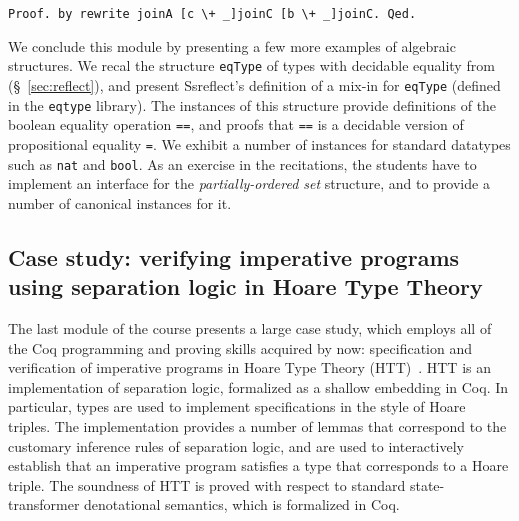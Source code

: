 \documentclass[blockstyle,preprint]{sigplanconf}
\newcommand{\is}[1]{\textcolor{blue}{(Ilya: {#1})}}
\newcommand{\an}[1]{\textcolor{red}{(Aleks: {#1})}}
\newcommand{\code}[1]{\lstinline{#1}}
\begin{document}
%
\begin{lstlisting}
Proof. by rewrite joinA [c \+ _]joinC [b \+ _]joinC. Qed.
\end{lstlisting}
%
%
%
%
We conclude this module by presenting a few more examples of algebraic
structures. We recal the structure \code{eqType} of types with
decidable equality from (\S~\ref{sec:reflect}), and present
Ssreflect's definition of a mix-in for \code{eqType} (defined in the
\code{eqtype} library). The instances of this structure provide
definitions of the boolean equality operation \code{==}, and proofs
that \code{==} is a decidable version of propositional equality
\code{=}. We exhibit a number of instances for standard datatypes such
as \code{nat} and \code{bool}. As an exercise in the recitations, the
students have to implement an interface for the
\emph{partially-ordered set} structure, and to provide a number of
canonical instances for it.


\subsection{Case study: verifying imperative programs using separation
  logic in Hoare Type Theory}

The last module of the course presents a large case study, which
employs all of the Coq programming and proving skills acquired by now:
specification and verification of imperative programs in Hoare Type
Theory (HTT)~\cite{Nanevski-al:JFP08,Nanevski-al:POPL10}.
%
HTT is an implementation of separation logic, formalized as a shallow
embedding in Coq. In particular, types are used to implement
specifications in the style of Hoare triples. The implementation
provides a number of lemmas that correspond to the customary inference
rules of separation logic, and are used to interactively establish
that an imperative program satisfies a type that corresponds to a
Hoare triple. The soundness of HTT is proved with respect to standard
state-transformer denotational semantics, which is formalized in Coq.
\end{document}
